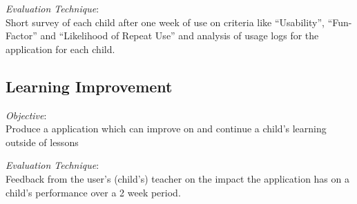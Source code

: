 \emph{Evaluation Technique}: \\
Short survey of each child after one week of use on criteria like ``Usability'', ``Fun-Factor'' and ``Likelihood of Repeat Use'' and analysis of usage logs for the application for each child.

\subsection{Learning Improvement}

\emph{Objective}: \\
Produce a application which can improve on and continue a child's learning outside of lessons

\emph{Evaluation Technique}: \\
Feedback from the user's (child's) teacher on the impact the application has on a child's performance over a 2 week period.
